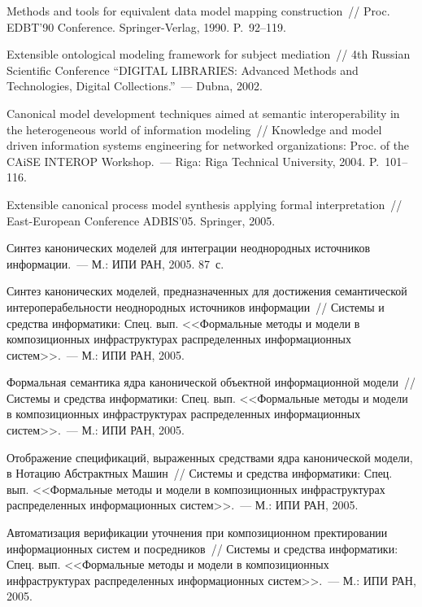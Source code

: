 \begin{multicols}{2}
{{\begin{thebibliography}{99}
Methods and tools for equivalent data model mapping construction~//
Proc. EDBT'90 Conference. Springer-Verlag, 1990. P.~92--119.

Extensible ontological modeling framework for subject mediation~//
4th Russian Scientific Conference ``DIGITAL LIBRARIES: Advanced Methods
and Technologies, Digital Collections.''~--- Dubna, 2002.

Canonical model development
techniques aimed at semantic interoperability in the heterogeneous
world of information modeling~//
Knowledge and model driven information systems engineering for networked
organizations: Proc. of the CAiSE \mbox{INTEROP} Workshop.~--- Riga:
Riga Technical University, 2004. P.~101--116.

Extensible canonical
process model synthesis applying formal interpretation~//
East-European Conference ADBIS'05. Springer, 2005.

Синтез канонических моделей для интеграции неоднородных источников
информации.~--- М.: ИПИ РАН, 2005. 87~с.

Синтез канонических моделей, предназначенных
для достижения семантической интероперабельности
неоднородных источников информации~//
Системы и средства информатики: Спец. вып. <<Формальные методы и модели
в композиционных инфраструктурах распределенных информационных систем>>.~---
М.: ИПИ РАН, 2005.

Формальная семантика ядра канонической объектной информационной модели~//
Систе\-мы и средства информатики: Спец. вып. <<Фор\-маль\-ные методы и модели
в композиционных инфраструктурах распределенных информационных сис\-тем>>.~---
М.: ИПИ РАН, 2005.

Отображение спецификаций, выраженных средствами ядра
канонической модели, в Нотацию Абстрактных Машин~//
Системы и средства информатики: Спец. вып. <<Формальные методы и модели
в композиционных инфраструктурах распределенных информационных систем>>.~---
М.: ИПИ РАН, 2005.

Автоматизация верификации уточнения при композиционном
пректировании информационных систем и посредников~//
Системы и средства информатики: Спец. вып. <<Формальные методы и модели
в композиционных инфраструктурах распределенных информационных систем>>.~---
М.: ИПИ РАН, 2005.


\end{thebibliography}}}
\end{multicols}
